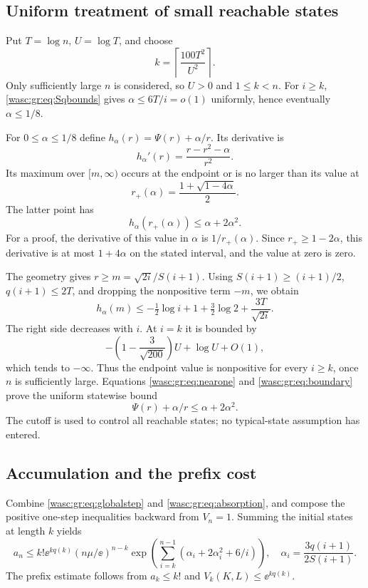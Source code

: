 \documentclass[11pt,a4paper]{article}
\theoremstyle{remark}\newtheorem{remark}[theorem]{Remark}
\numberwithin{equation}{section}
\begin{document}
\subsection{Uniform treatment of small reachable states}
Put $T=\log n$, $U=\log T$, and choose
\begin{equation}\label{wasc:gr:eq:cutoff}
k=\left\lceil\frac{100T^2}{U^2}\right\rceil.
\end{equation}
Only sufficiently large $n$ is considered, so $U>0$ and $1\le k<n$. For $i\ge k$, \eqref{wasc:gr:eq:Sqbounds} gives $\alpha\le6T/i=o(1)$ uniformly, hence eventually $\alpha\le1/8$.

For $0\le\alpha\le1/8$ define $h_\alpha(r)=\Psi(r)+\alpha/r$. Its derivative is
\[
h_\alpha'(r)=\frac{r-r^2-\alpha}{r^2}.
\]
Its maximum over $[m,\infty)$ occurs at the endpoint or is no larger than its value at
\[
r_+(\alpha)=\frac{1+\sqrt{1-4\alpha}}2.
\]
The latter point has
\begin{equation}\label{wasc:gr:eq:nearone}
h_\alpha(r_+(\alpha))\le\alpha+2\alpha^2.
\end{equation}
For a proof, the derivative of this value in $\alpha$ is $1/r_+(\alpha)$. Since $r_+\ge1-2\alpha$, this derivative is at most $1+4\alpha$ on the stated interval, and the value at zero is zero.

The geometry gives $r\ge m=\sqrt{2i}/S(i+1)$. Using $S(i+1)\ge(i+1)/2$, $q(i+1)\le2T$, and dropping the nonpositive term $-m$, we obtain
\begin{equation}\label{wasc:gr:eq:boundary}
h_\alpha(m)\le-\tfrac12\log i+1+\tfrac32\log2+\frac{3T}{\sqrt{2i}}.
\end{equation}
The right side decreases with $i$. At $i=k$ it is bounded by
\[
-\left(1-\frac3{\sqrt{200}}\right)U+\log U+O(1),
\]
which tends to $-\infty$. Thus the endpoint value is nonpositive for every $i\ge k$, once $n$ is sufficiently large. Equations \eqref{wasc:gr:eq:nearone} and \eqref{wasc:gr:eq:boundary} prove the uniform statewise bound
\begin{equation}\label{wasc:gr:eq:absorption}
\Psi(r)+\alpha/r\le\alpha+2\alpha^2.
\end{equation}
The cutoff is used to control all reachable states; no typical-state assumption has entered.

\subsection{Accumulation and the prefix cost}
Combine \eqref{wasc:gr:eq:globalstep} and \eqref{wasc:gr:eq:absorption}, and compose the positive one-step inequalities backward from $V_n=1$. Summing the initial states at length $k$ yields
\begin{equation}\label{wasc:gr:eq:finetelescope}
a_n\le k!\ee^{kq(k)}(n\mu/\ee)^{n-k}
\exp\!\left(\sum_{i=k}^{n-1}(\alpha_i+2\alpha_i^2+6/i)\right),
\quad \alpha_i=\frac{3q(i+1)}{2S(i+1)}.
\end{equation}
The prefix estimate follows from $a_k\le k!$ and $V_k(K,L)\le\ee^{kq(k)}$.
\end{document}
